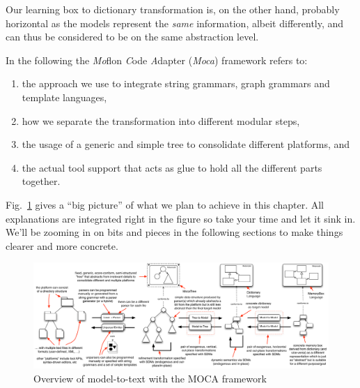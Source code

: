 Our learning box to dictionary transformation is, on the other hand, probably horizontal as the models represent the \emph{same} information, albeit differently, and can thus be considered to be on the same abstraction level.

\vspace{1.5cm}


In the following the \emph{Mo}flon \emph{C}ode \emph{A}dapter (\emph{Moca}) framework refers to:
\begin{enumerate}
 \item the approach we use to integrate string grammars, graph grammars and template languages, 
 \item how we separate the transformation into different modular steps, 
 \item the usage of a generic and simple tree to consolidate different platforms, and 
 \item the actual tool support that acts as glue to hold all the different parts together.
\end{enumerate}
 
Fig.~\ref{fig:moca-overview} gives a ``big picture'' of what we plan to achieve in this chapter.
All explanations are integrated right in the figure so take your time and let it sink in.
We'll be zooming in on bits and pieces in the following sections to make things clearer and more concrete.
\begin{figure}[htp]
\begin{center}
 \includegraphics[angle=90, height=\textheight]{pics/moca/text-to-model}
  \caption{Overview of model-to-text with the MOCA framework}
  \label{fig:moca-overview}
\end{center}
\end{figure} 



 
 








%
 
